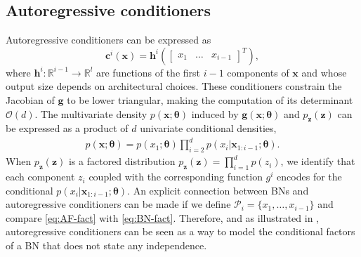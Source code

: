 \subsection{Autoregressive conditioners}
Autoregressive conditioners can be expressed as
$$\mathbf{c}^i(\mathbf{x}) = \mathbf{h}^i\left(\begin{bmatrix} x_1 & \hdots & x_{i-1} \end{bmatrix}^T\right),$$ where $\mathbf{h}^i: \mathbb{R}^{i-1} \rightarrow \mathbb{R}^l$ are functions of the first $i-1$ components of $\mathbf{x}$ and whose output size depends on architectural choices.
These conditioners constrain the Jacobian of $\mathbf{g}$ to be lower triangular, making the computation of its determinant $\mathcal{O}(d)$.
The multivariate density $p(\mathbf{x}; \mathbf{\theta})$ induced by $\mathbf{g}(\mathbf{x};\mathbf{\theta})$ and $p_{\mathbf{z}}(\mathbf{z})$ can be expressed as a product of $d$ univariate conditional densities,
\begin{align}
    p(\mathbf{x}; \mathbf{\theta}) = p(x_1; \mathbf{\theta})\prod^{d}_{i=2}p(x_{i}|\mathbf{x}_{1:i-1}; \mathbf{\theta}). \label{eq:AF-fact}
\end{align}
When $p_{\mathbf{z}}(\mathbf{z})$ is a factored distribution $p_{\mathbf{z}}(\mathbf{z}) = \prod^{d}_{i=1}p(z_i)$, we identify that each component $z_i$ coupled with the corresponding function $g^i$ encodes for the conditional $p(x_{i}|\mathbf{x}_{1:i-1}; \mathbf{\theta})$.
An explicit connection between BNs and autoregressive conditioners can be made if we define $\mathcal{P}_i = \{x_1, \hdots, x_{i-1}\}$ and compare \eqref{eq:AF-fact} with \eqref{eq:BN-fact}.  Therefore, and as illustrated in , autoregressive conditioners can be seen as a way to model the conditional factors of a BN that does not state any independence.
